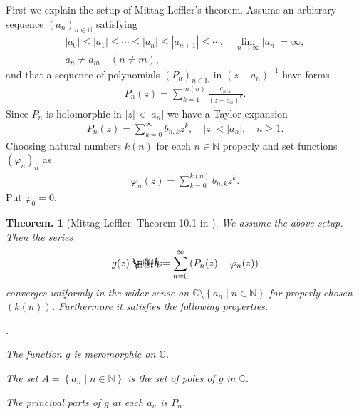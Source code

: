 \documentclass[openany, a4paper, oneside]{jsbook}
\makeatletter
\newcounter{enum2}
\renewenvironment{enumerate}{%
\begin{list}%
{%
\arabic{enum2}.\ \,%
}%
{%
\usecounter{enum2}
\setlength{\itemindent}{0pt}%
\setlength{\leftmargin}{15pt}%
\setlength{\rightmargin}{0pt}%
\setlength{\labelsep}{0pt}%
\setlength{\labelwidth}{6pt}%
\setlength{\itemsep}{0pt}%
\setlength{\parsep}{0pt}%
\setlength{\listparindent}{0pt}%
}
}{%
\end{list}%
}
\newcommand*{\defeq}{\mathrel{\rlap{%
\raisebox{0.3ex}{$\m@th\cdot$}}%
\raisebox{-0.3ex}{$\m@th\cdot$}}%
=}
\theoremstyle{break}
\newtheorem{thm}{Theorem.}[section]
\theoremstyle{breakdefn}
\newcommand{\abs}[1]{\left|#1\right|}
\newcommand{\rbk}[1]{\left (#1\right)}
\newcommand{\relmiddle}[1]{\mathrel{}\middle#1\mathrel{}}
\newcommand{\set}[2]{\left\{#1 \relmiddle| #2\right\}}
\newcommand{\bbC}{\mathbb{C}}
\newcommand{\bbN}{\mathbb{N}}
\makeatother
\begin{document}
First we explain the setup of Mittag-Leffler's theorem.
Assume an arbitrary sequence $(a_n)_{n \in \bbN}$ satisfying
\begin{gather}
 \abs{a_0} \leq \abs{a_1} \leq \cdots \leq \abs{a_n} \leq \abs{a_{n+1}} \leq \cdots, \quad \lim_{n \to \infty} \abs{a_n} = \infty, \\
 a_n \neq a_m \quad (n \neq m),
\end{gather}
and that a sequence of polynomials $(P_n)_{n \in \bbN}$ in $(z - a_n)^{-1}$ have forms
\begin{align}
 P_n (z)
 =
 \sum_{k=1}^{m (n)} \frac{c_{n,k}}{(z - a_n)^k}.
\end{align}
Since $P_n$ is holomorphic in $\abs{z} < \abs{a_n}$ we have a Taylor expansion
\begin{align}
 P_n (z)
 =
 \sum_{k=0}^{\infty} b_{n,k} z^k, \quad \abs{z} < \abs{a_n}, \quad n \geq 1.
\end{align}
Choosing natural numbers $k (n)$ for each $n \in \bbN$ properly and set functions $(\varphi_n)_n$ as
\begin{align}
 \varphi_n (z)
 =
 \sum_{k=0}^{k (n)} b_{n, k} z^k.
\end{align}
Put $\varphi_0 = 0$.
\begin{thm}[Mittag-Leffler. Theorem 10.1 in \cite{MitsuoSugiura2}]
 We assume the above setup.
 Then the series
 \begin{align}
  g (z)
  \defeq
  \sum_{n=0}^{\infty} \rbk{P_n (z) - \varphi_n (z)}
 \end{align}
 converges uniformly in the wider sense on $\bbC \setminus \set{a_n}{n \in \bbN}$ for properly chosen $(k (n))$.
 Furthermore it satisfies the following properties.
\begin{enumerate}
\item The function $g$ is meromorphic on $\bbC$.
\item The set $A = \set{a_n}{n \in \bbN}$ is the set of poles of $g$ in $\bbC$.
\item The principal parts of $g$ at each $a_n$ is $P_n$.
\end{enumerate}
\end{thm}
\end{document}
